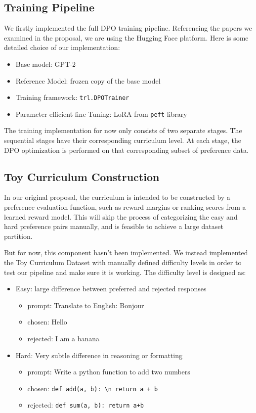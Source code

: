 \documentclass{article}
\begin{document}
\subsection{Training Pipeline}
We firstly implemented the full DPO training pipeline. Referencing the papers we examined in the proposal, we are using the Hugging Face platform. Here is some detailed choice of our implementation:
\begin{itemize}
    \item Base model: GPT-2
    \item Reference Model: frozen copy of the base model
    \item Training framework: \texttt{trl.DPOTrainer}
    \item Parameter efficient fine Tuning: LoRA from \texttt{peft} library
\end{itemize}

The training implementation for now only consists of two separate stages. The sequential stages have their corresponding curriculum level. At each stage, the DPO optimization is performed on that corresponding subset of preference data.

\subsection{Toy Curriculum Construction}
In our original proposal, the curriculum is intended to be constructed by a preference evaluation function, such as reward margins or ranking scores \cite{pattnaik2024currydpo} from a learned reward model. This will skip the process of categorizing the easy and hard preference pairs manually, and is feasible to achieve a large dataset partition.

But for now, this component hasn't been implemented. We instead implemented the Toy Curriculum Dataset with manually defined difficulty levels in order to test our pipeline and make sure it is working. The difficulty level is designed as:
\begin{itemize}
    \item Easy: large difference between preferred and rejected responses
    \begin{itemize}
        \item prompt: Translate to English: Bonjour
        \item chosen: Hello
        \item rejected: I am a banana
    \end{itemize}
    \item Hard: Very subtle difference in reasoning or formatting
    \begin{itemize}
        \item prompt: Write a python function to add two numbers
        \item chosen: \texttt{def add(a, b): \textbackslash n    return a + b}
        \item rejected: \texttt{def sum(a, b): return a+b}
    \end{itemize}
\end{itemize}
\end{document}

